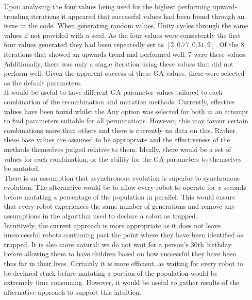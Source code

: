\documentclass{article}
\begin{document}
Upon analysing the four values being used for the highest performing upward-trending iterations it appeared that successful values had been found through an issue in the code. When generating random values, Unity cycles through the same values if not provided with a seed.  As the four values were consistently the first four values generated they had been repeatedly set as $[2, 0.77, 0.31, 9]$. Of the 8 iterations that showed an upwards trend and performed well, 7 were these values. Additionally, there was only a single iteration using these values that did not perform well. Given the apparent success of these GA values, these were selected as the default parameters. \\
It would be useful to have different GA parameter values tailored to each combination of the recombination and mutation methods. Currently, effective values have been found whilst the Any option was selected for both in an attempt to find parameters suitable for all permutations. However, this may favour certain combinations more than others and there is currently no data on this. Rather, these base values are assumed to be appropriate and the effectiveness of the methods themselves judged relative to them. Ideally, there would be a set of values for each combination, or the ability for the GA parameters to themselves be mutated. \\

There is an assumption that asynchronous evolution is superior to synchronous evolution. The alternative would be to allow every robot to operate for $x$ seconds before mutating a percentage of the population in parallel. This would ensure that every robot experiences the same number of generations and remove any assumptions in the algorithm used to declare a robot as trapped. \\
Intuitively, the current approach is more appropriate as it does not leave unsuccessful robots continuing past the point where they have been identified as trapped. It is also more natural: we do not wait for a person’s 30th birthday before allowing them to have children based on how successful they have been thus far in their lives. Certainly it is more efficient, as waiting for every robot to be declared stuck before mutating a portion of the population would be extremely time consuming. However, it would be useful to gather results of the alternative approach to support this intuition. \\
\end{document}
